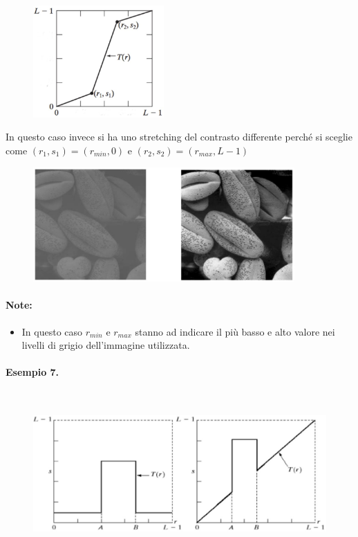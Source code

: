 \begin{figure}[H]
    \centering
    \includegraphics[width=5cm, keepaspectratio]{capitoli/immagini/imgs/lineare_a_tratti_esempio_6.jpg}
\end{figure}

In questo caso invece si ha uno stretching del contrasto differente perché si
sceglie come $(r_1, s_1) = (r_{min}, 0)$ e $(r_2, s_2) = (r_{max} , L - 1)$

\begin{figure}[H]
    \centering
    \includegraphics[width=10cm, keepaspectratio]{capitoli/immagini/imgs/globuli_rossi.jpg}
\end{figure}

\paragraph{Note:}
\begin{itemize}
    \item In questo caso $r_{min}$ e $r_{max}$ stanno ad indicare il più basso e alto valore
          nei livelli di grigio dell'immagine utilizzata.
\end{itemize}

\paragraph{Esempio 7.}\ \\

\begin{figure}[H]
    \centering
    \includegraphics[width=\linewidth, keepaspectratio]{capitoli/immagini/imgs/trasformazioni_lineari_esempio_7.jpg}
\end{figure}

